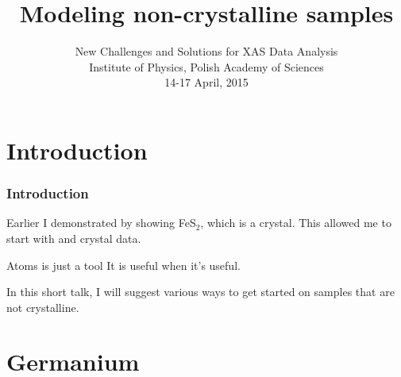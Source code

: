 \documentclass[10pt, xcolor=x11names, compress]{beamer}
\title{Modeling non-crystalline samples}
\date[IFPAN, April 2015]{New Challenges and Solutions for XAS Data Analysis\\
  Institute of Physics, Polish Academy of Sciences\\14-17 April, 2015}
\begin{document}
\maketitle



\section[Introduction]{Introduction}
\begin{frame}
  \frametitle{Introduction}
  Earlier I demonstrated {\artemis} by showing FeS$_2$, which is a
  crystal.  This allowed me to start with {\atoms} and crystal data.

  \begin{alertblock}{Atoms is just a tool}
    It is useful when it's useful.
  \end{alertblock}

  In this short talk, I will suggest various ways to get started on
  samples that are not crystalline.
\end{frame}

\section{Germanium}
\label{sec:ge}
\end{document}
